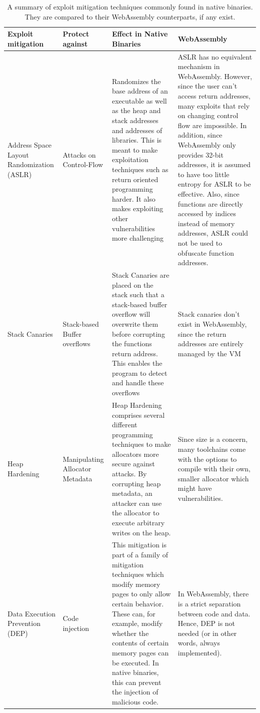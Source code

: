 \documentclass[sigconf]{acmart}
\begin{document}
\begin{table}
\begin{tabular}{p{2cm} | p{2cm} | p{6cm} | p{6cm} }
  \toprule
  Exploit mitigation & Protect against & Effect in Native Binaries & WebAssembly \\
  \midrule
  Address Space Layout Randomization (ASLR) & Attacks on Control-Flow & Randomizes the base address of an executable as well as the heap and stack addresses and addresses of libraries. This is meant to make exploitation techniques such as return oriented programming harder. It also makes exploiting other vulnerabilities more challenging& ASLR has no equivalent mechanism in WebAssembly. However, since the user can't access return addresses, many exploits that rely on changing control flow are impossible. In addition, since WebAssembly only provides 32-bit addresses, it is assumed to have too little entropy for ASLR to be effective. Also, since functions are directly accessed by indices instead of memory addresses, ASLR could not be used to obfuscate function addresses. \\ \hline
   Stack Canaries & Stack-based Buffer overflows & Stack Canaries are placed on the stack such that a stack-based buffer overflow will overwrite them before corrupting the functions return address. This enables the program to detect and handle these overflows & Stack canaries don't exist in WebAssembly, since the return addresses are entirely managed by the VM \\ \hline
   Heap Hardening & Manipulating Allocator Metadata & Heap Hardening comprises several different programming techniques to make allocators more secure against attacks. By corrupting heap metadata, an attacker can use the allocator to execute arbitrary writes on the heap. & Since size is a concern, many toolchains come with the options to compile with their own, smaller allocator which might have vulnerabilities.\\ \hline
   Data Execution Prevention (DEP) & Code injection & This mitigation is part of a family of mitigation techniques which modify memory pages to only allow certain behavior. These can, for example, modify whether the contents of certain memory pages can be executed. In native binaries, this can prevent the injection of malicious code. & In WebAssembly, there is a strict separation between code and data. Hence, DEP is not needed (or in other words, always implemented).
\end{tabular}
\caption{A summary of exploit mitigation techniques commonly found in native binaries. They are compared to their WebAssembly counterparts, if any exist.}
\label{table:exploit_mitigation_wasm}
\end{table}
\end{document}
